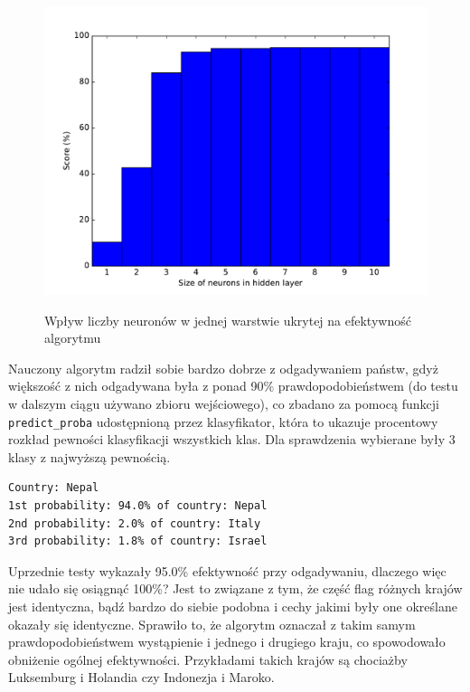 \begin{figure}[h!]
	\centering
	\includegraphics[width=0.95\linewidth]{hidden_sizes.pdf}
	\label{hidden_sizes}
	\caption{Wpływ liczby neuronów w jednej warstwie ukrytej na efektywność algorytmu}
\end{figure}

\newpage

Nauczony algorytm radził sobie bardzo dobrze z odgadywaniem państw, gdyż większość z nich odgadywana była z ponad 90\% prawdopodobieństwem (do testu w dalszym ciągu używano zbioru wejściowego), co zbadano za pomocą funkcji \texttt{predict\_proba} udostępnioną przez klasyfikator, która to ukazuje procentowy rozkład pewności klasyfikacji wszystkich klas. Dla sprawdzenia wybierane były 3 klasy z najwyższą pewnością.

\begin{lstlisting}[caption=Przykładowy rozkład pewności klas dla dla poprawnego wskazania państwa Nepal]
Country: Nepal
1st probability: 94.0% of country: Nepal
2nd probability: 2.0% of country: Italy
3rd probability: 1.8% of country: Israel
\end{lstlisting}

Uprzednie testy wykazały 95.0\% efektywność przy odgadywaniu, dlaczego więc nie udało się osiągnąć 100\%? Jest to związane z tym, że część flag różnych krajów jest identyczna, bądź bardzo do siebie podobna i cechy jakimi były one określane okazały się identyczne. Sprawiło to, że algorytm oznaczał z takim samym prawdopodobieństwem wystąpienie i jednego i drugiego kraju, co spowodowało obniżenie ogólnej efektywności. Przykładami takich krajów są chociażby Luksemburg i Holandia czy Indonezja i Maroko.

